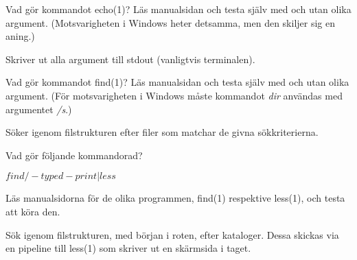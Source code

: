 \documentclass[a4paper]{miunasgn}
\begin{document}
\begin{questions}
	\question\label{q:echo}
	Vad gör kommandot echo(1)?
	Läs manualsidan och testa själv med och utan olika argument.
	(Motsvarigheten i Windows heter detsamma, men den skiljer sig en aning.)
	\begin{solution}
		Skriver ut alla argument till stdout (vanligtvis terminalen).
	\end{solution}

	\question\label{q:find}
	Vad gör kommandot find(1)?
	Läs manualsidan och testa själv med och utan olika argument.
	(För motsvarigheten i Windows måste kommandot \emph{dir} användas med 
	argumentet \emph{/s}.)
	\begin{solution}
		Söker igenom filstrukturen efter filer som matchar de givna sökkriterierna.
	\end{solution}

	\question\label{q:findless}
	Vad gör följande kommandorad?
	\begin{terminal}
$ find / -type d -print | less
$
	\end{terminal}
	Läs manualsidorna för de olika programmen, find(1) respektive less(1), och 
	testa att köra den.
	\begin{solution}
		Sök igenom filstrukturen, med början i roten, efter kataloger.
		Dessa skickas via en pipeline till less(1) som skriver ut en skärmsida 
		i taget.
	\end{solution}

	\question\label{q:fs}


\end{questions}
\end{document}
